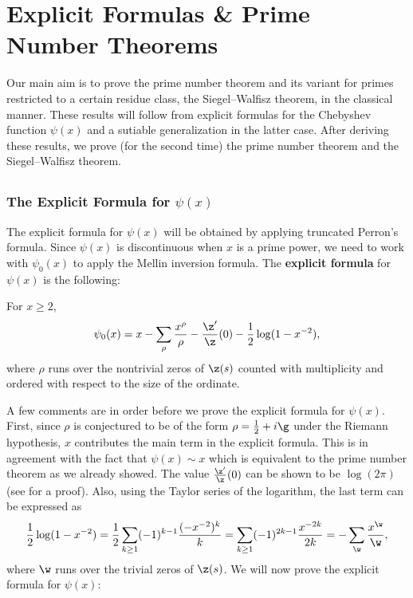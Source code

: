 \chapter{Explicit Formulas \& Prime Number Theorems}
  Our main aim is to prove the prime number theorem and its variant for primes restricted to a certain residue class, the Siegel–Walfisz theorem, in the classical manner. These results will follow from explicit formulas for the Chebyshev function $\psi(x)$ and a sutiable generalization in the latter case. After deriving these results, we prove (for the second time) the prime number theorem and the Siegel–Walfisz theorem.
  \section{}
    \subsection*{The Explicit Formula for \texorpdfstring{$\psi(x)$}{$\psi(x)$}}
      The explicit formula for $\psi(x)$ will be obtained by applying truncated Perron's formula. Since $\psi(x)$ is discontinuous when $x$ is a prime power, we need to work with $\psi_{0}(x)$ to apply the Mellin inversion formula. The \textbf{explicit formula} for $\psi(x)$ is the following:

      \begin{theorem}
        For $x \ge 2$,
        \[
          \psi_{0}(x) = x-\sum_{\rho}\frac{x^{\rho}}{\rho}-\frac{\z'}{\z}(0)-\frac{1}{2}\log(1-x^{-2}),
        \]
        where $\rho$ runs over the nontrivial zeros of $\z(s)$ counted with multiplicity and ordered with respect to the size of the ordinate.
      \end{theorem}

      A few comments are in order before we prove the explicit formula for $\psi(x)$. First, since $\rho$ is conjectured to be of the form $\rho = \frac{1}{2}+i\g$ under the Riemann hypothesis, $x$ contributes the main term in the explicit formula. This is in agreement with the fact that $\psi(x) \sim x$ which is equivalent to the prime number theorem as we already showed. The value $\frac{\z'}{\z}(0)$ can be shown to be $\log(2\pi)$ (see \cite{davenport1980multiplicative} for a proof). Also, using the Taylor series of the logarithm, the last term can be expressed as
      \[
        \frac{1}{2}\log(1-x^{-2}) = \frac{1}{2}\sum_{k \ge 1}(-1)^{k-1}\frac{(-x^{-2})^{k}}{k} = \sum_{k \ge 1}(-1)^{2k-1}\frac{x^{-2k}}{2k} = -\sum_{\w}\frac{x^{\w}}{\w},
      \]
      where $\w$ runs over the trivial zeros of $\z(s)$. We will now prove the explicit formula for $\psi(x)$:

